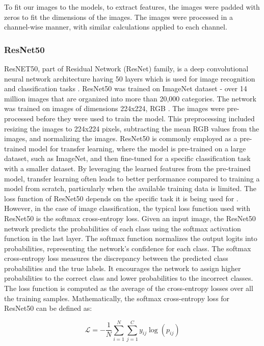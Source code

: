 \documentclass[12pt,a4paper]{article}
\begin{document}
To fit our images to the models, to extract features, the images were padded with zeros to fit the dimensions of the images. The images were processed in a channel-wise manner, with similar calculations applied to each channel.

\subsubsection{ResNet50}
ResNET50, part of Residual Network (ResNet) family, is a deep convolutional neural network architecture having 50 layers which is used for image recognition and classification tasks \cite{DBLP:journals/corr/HeZRS15}. ResNet50 was trained on ImageNet dataset - over 14 million images that are organized into more than 20,000 categories. The network was trained on images of dimensions 224x224, RGB \cite{DBLP:journals/corr/HeZRS15}. The images were pre-processed before they were used to train the model. This preprocessing included resizing the images to 224x224 pixels, subtracting the mean RGB values from the images, and normalizing the images. ResNet50 is commonly employed as a pre-trained model for transfer learning, where the model is pre-trained on a large dataset, such as ImageNet, and then fine-tuned for a specific classification task with a smaller dataset. By leveraging the learned features from the pre-trained model, transfer learning often leads to better performance compared to training a model from scratch, particularly when the available training data is limited. The loss function of ResNet50 depends on the specific task it is being used for \cite{DBLP:journals/corr/HeZRS15}. However, in the case of image classification, the typical loss function used with ResNet50 is the softmax cross-entropy loss. Given an input image, the ResNet50 network predicts the probabilities of each class using the softmax activation function in the last layer. The softmax function normalizes the output logits into probabilities, representing the network's confidence for each class. The softmax cross-entropy loss measures the discrepancy between the predicted class probabilities and the true labels. It encourages the network to assign higher probabilities to the correct class and lower probabilities to the incorrect classes. The loss function is computed as the average of the cross-entropy losses over all the training samples. Mathematically, the softmax cross-entropy loss for ResNet50 can be defined as:

\[
\mathcal{L} = -\frac{1}{N}\sum_{i=1}^{N}\sum_{j=1}^{C}y_{ij}\log(p_{ij})
\]
\end{document}
